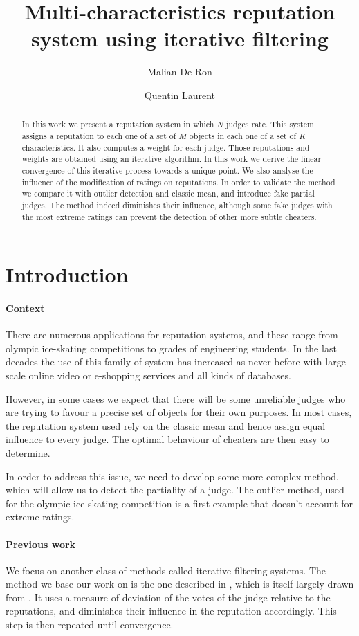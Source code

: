 \documentclass[12pt,a4paper]{article}
\title{Multi-characteristics reputation system using iterative filtering}
\author{Malian De Ron \and Quentin Laurent}
\begin{document}
\maketitle
\begin{abstract}
In this work we present a reputation system in which $N$ judges rate. This system assigns a reputation to each one of a set of $M$ objects in each one of a set of $K$ characteristics. It also computes a weight for each judge. Those reputations and weights are obtained using an iterative algorithm. In this work we derive the linear convergence of this iterative process towards a unique point. We also analyse the influence of the modification of ratings on reputations. In order to validate the method we compare it with outlier detection and classic mean, and introduce fake partial judges. The method indeed diminishes their influence, although some fake judges with the most extreme ratings can prevent the detection of other more subtle cheaters. \end{abstract}
\tableofcontents
\section{Introduction}
\paragraph{Context}
There are numerous applications for reputation systems, and these range from olympic ice-skating competitions to grades of engineering students. 
In the last decades the use of this family of system has increased as never before with large-scale online video or e-shopping services and all kinds of databases.

However, in some cases we expect that there will be some unreliable judges who are trying to favour a precise set of objects for their own purposes. In most cases, the reputation system used rely on the classic mean and hence assign equal influence to every judge. The optimal behaviour of cheaters are then easy to determine. 

In order to address this issue, we need to develop some more complex method, which will allow us to detect the partiality of a judge. The outlier method, used for the olympic ice-skating competition is a first example that doesn't account for extreme ratings.
\paragraph{Previous work}
We focus on another class of methods called iterative filtering systems. The method we base our work on is the one described in \cite{Cristo1}, which is itself largely drawn from \cite{laureti2006information}. It uses a measure of deviation of the votes of the judge relative to the reputations, and diminishes their influence in the reputation accordingly. This step is then repeated until convergence.
\end{document}
